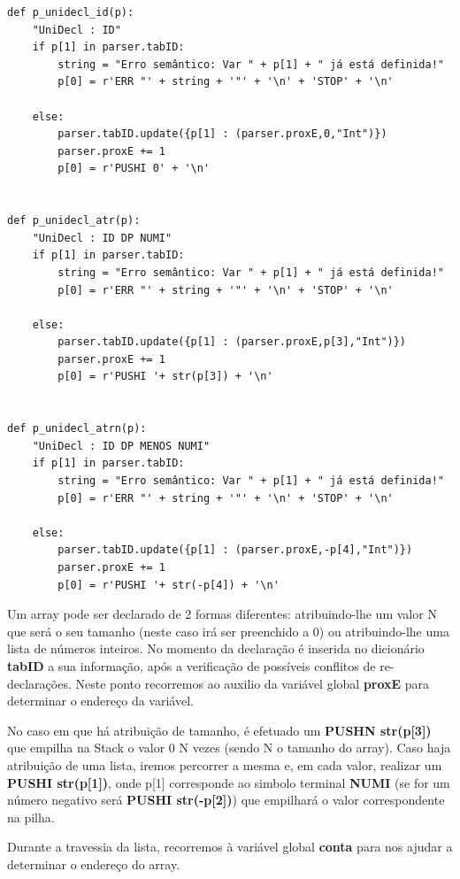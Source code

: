 \documentclass{article}
\begin{document}
\clearpage
\begin{lstlisting}[firstnumber=52]
def p_unidecl_id(p): 
    "UniDecl : ID"
    if p[1] in parser.tabID:
        string = "Erro semântico: Var " + p[1] + " já está definida!"
        p[0] = r'ERR "' + string + '"' + '\n' + 'STOP' + '\n'
    
    else:
        parser.tabID.update({p[1] : (parser.proxE,0,"Int")})
        parser.proxE += 1
        p[0] = r'PUSHI 0' + '\n'


def p_unidecl_atr(p):
    "UniDecl : ID DP NUMI"
    if p[1] in parser.tabID:
        string = "Erro semântico: Var " + p[1] + " já está definida!"
        p[0] = r'ERR "' + string + '"' + '\n' + 'STOP' + '\n'
    
    else:
        parser.tabID.update({p[1] : (parser.proxE,p[3],"Int")})
        parser.proxE += 1
        p[0] = r'PUSHI '+ str(p[3]) + '\n'


def p_unidecl_atrn(p):
    "UniDecl : ID DP MENOS NUMI"
    if p[1] in parser.tabID:
        string = "Erro semântico: Var " + p[1] + " já está definida!"
        p[0] = r'ERR "' + string + '"' + '\n' + 'STOP' + '\n'
    
    else:
        parser.tabID.update({p[1] : (parser.proxE,-p[4],"Int")})
        parser.proxE += 1
        p[0] = r'PUSHI '+ str(-p[4]) + '\n'
\end{lstlisting}

\par Um array pode ser declarado de 2 formas diferentes: atribuindo-lhe um valor N que será o seu tamanho (neste caso irá ser preenchido a 0) ou atribuindo-lhe uma lista de números inteiros. No momento da declaração é inserida no dicionário \textbf{tabID} a sua informação, após a verificação de possíveis conflitos de re-declarações. Neste ponto recorremos ao auxilio da variável global \textbf{proxE} para determinar o endereço da variável.
\par No caso em que há atribuição de tamanho, é efetuado um \textbf{PUSHN str(p[3])} que empilha na Stack o valor 0 N vezes (sendo N o tamanho do array). Caso haja atribuição de uma lista, iremos percorrer a mesma e, em cada valor, realizar um \textbf{PUSHI str(p[1])}, onde p[1] corresponde ao simbolo terminal \textbf{NUMI} (se for um número negativo será \textbf{PUSHI str(-p[2])}) que empilhará o valor correspondente na pilha. 
\par Durante a travessia da lista, recorremos à variável global \textbf{conta} para nos ajudar a determinar o endereço do array.
\end{document}
